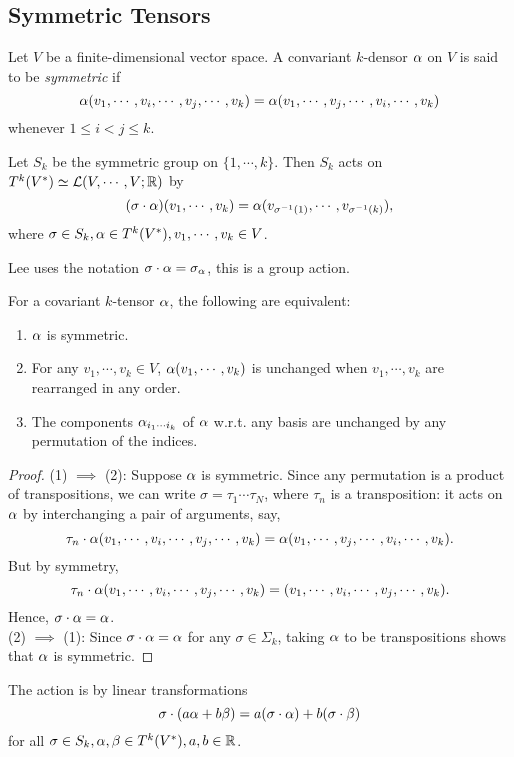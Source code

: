 \subsection{Symmetric Tensors}
Let $V$ be a finite-dimensional vector space. A convariant $k$-densor $\alpha$ on $V$ is said to be \textit{symmetric} if 
$$\alpha(v_1, \cdots, v_i, \cdots, v_j, \cdots, v_k) = \alpha(v_1, \cdots, v_j, \cdots, v_i, \cdots, v_k) $$ whenever $1\leq i < j \leq k$. 

Let $S_k$ be the symmetric group on $\{1, \cdots, k\}$. Then $S_k$ acts on $T^k(V^*) \simeq \mathcal{L}(V, \cdots, V; \mathbb{R})$ by 
$$(\sigma \cdot \alpha)(v_1, \cdots, v_k) = \alpha(v_{\sigma^{-1}(1)}, \cdots, v_{\sigma^{-1}(k)}), $$ where $\sigma \in S_k, \alpha \in T^k(V^*), v_1, \cdots, v_k \in V$. 
\begin{remark}
    Lee uses the notation $\sigma \cdot \alpha = \sigma_\alpha$,
    this is a group action. 
\end{remark}
\begin{exercise}
    For a covariant $k$-tensor $\alpha$, the following are equivalent:
    \begin{enumerate}
    \item $\alpha$ is symmetric. 
    \item For any $v_1, \cdots, v_k \in V$, $\alpha(v_1, \cdots, v_k)$ is unchanged when $v_1, \cdots, v_k$ are rearranged in any order. 
    \item The components $\alpha_{i_1\cdots i_k}$ of $\alpha$ w.r.t. any basis are unchanged by any permutation of the indices. 
    \end{enumerate}
\end{exercise}
\begin{proof}
    (1) $\implies$ (2): Suppose $\alpha$ is symmetric. Since any permutation is a product of transpositions, we can write $\sigma = \tau_1 \cdots \tau_N$, where $\tau_n$ is a transposition: it acts on $\alpha$ by interchanging a pair of arguments, say,
    $$\tau_n \cdot \alpha (v_1, \cdots, v_i, \cdots, v_j, \cdots, v_k) = \alpha(v_1, \cdots, v_j, \cdots, v_i, \cdots, v_k). $$ But by symmetry,
    $$\tau_n \cdot \alpha (v_1, \cdots, v_i, \cdots, v_j, \cdots, v_k) = (v_1, \cdots, v_i, \cdots, v_j, \cdots, v_k). $$ Hence, $\sigma \cdot \alpha = \alpha$. \\
    (2) $\implies$ (1): Since $\sigma \cdot \alpha = \alpha$ for any $\sigma \in \Sigma_k$, taking $\alpha$ to be transpositions shows that $\alpha$ is symmetric. 
\end{proof}
\begin{proposition}
    The action is by linear transformations
    $$\sigma \cdot (a \alpha + b \beta) = a(\sigma \cdot \alpha) + b(\sigma \cdot \beta)$$ for all $\sigma \in S_k, \alpha, \beta \in T^k(V^*), a, b \in \mathbb{R}$. 
\end{proposition}

